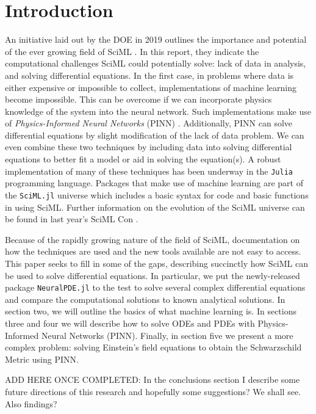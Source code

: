 \documentclass{CUP-JNL-DTM}%
\theoremstyle{definition}
\numberwithin{equation}{section}
\newcommand{\Julia}{\texttt{Julia} }
\begin{document}
\section{Introduction}

An initiative laid out by the DOE in 2019 outlines the importance and potential of the ever growing field of SciML \cite{bakerWorkshopReportBasic2019}. In this report, they indicate the computational challenges SciML could potentially solve: lack of data in analysis, and solving differential equations. In the first case, in problems where data is either expensive or impossible to collect, implementations of machine learning become impossible. This can be overcome if we can incorporate physics knowledge of the system into the neural network. Such implementations make use of \emph{Physics-Informed Neural Networks} (PINN) \cite{karniadakisPhysicsinformedMachineLearning2021}. Additionally, PINN can solve differential equations by slight modification of the lack of data problem. We can even combine these two techniques by including data into solving differential equations to better fit a model or aid in solving the equation(s). A robust implementation of many of these techniques has been underway in the \Julia programming language. Packages that make use of machine learning are part of the \texttt{SciML.jl} universe which includes a basic syntax for code and basic functions in using SciML. Further information on the evolution of the SciML universe can be found in last year's SciML Con \cite{SciMLCon2022}. 

Because of the rapidly growing nature of the field of SciML, documentation on how the techniques are used and the new tools available are not easy to access. This paper seeks to fill in some of the gaps, describing succinctly how SciML can be used to solve differential equations. In particular, we put the newly-released package \texttt{NeuralPDE.jl} to the test to solve several complex differential equations and compare the computational solutions to known analytical solutions. In section two, we will outline the basics of what machine learning is. In sections three and four we will describe how to solve ODEs and PDEs with Physics-Informed Neural Networks (PINN). Finally, in section five we present a more complex problem: solving Einstein's field equations to obtain the Schwarzschild Metric using PINN. 

ADD HERE ONCE COMPLETED:
In the conclusions section I describe some future directions of this research and hopefully some suggestions? We shall see. Also findings?
\end{document}
